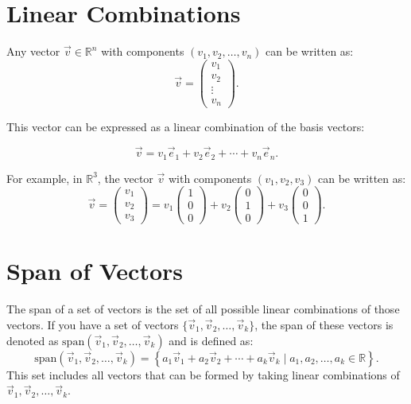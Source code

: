 \documentclass[12pt]{article}
\begin{document}
\section{Linear Combinations}

Any vector \(\vec{v} \in \mathbb{R}^n\) with components \((v_1, v_2, \ldots, v_n)\) can be written as:
\[
\vec{v} = \begin{pmatrix} v_1 \\ v_2 \\ \vdots \\ v_n \end{pmatrix}.
\]

This vector can be expressed as a linear combination of the basis vectors:

\[
\vec{v} = v_1 \vec{e}_1 + v_2 \vec{e}_2 + \cdots + v_n \vec{e}_n.
\]

For example, in \(\mathbb{R}^3\), the vector \(\vec{v}\) with components \((v_1, v_2, v_3)\) can be written as:
\[
\vec{v} = \begin{pmatrix} v_1 \\ v_2 \\ v_3 \end{pmatrix} = v_1 \begin{pmatrix} 1 \\ 0 \\ 0 \end{pmatrix} + v_2 \begin{pmatrix} 0 \\ 1 \\ 0 \end{pmatrix} + v_3 \begin{pmatrix} 0 \\ 0 \\ 1 \end{pmatrix}.
\]

\section{Span of Vectors}

The span of a set of vectors is the set of all possible linear combinations of those vectors. If you have a set of vectors \(\{\vec{v}_1, \vec{v}_2, \ldots, \vec{v}_k\}\), the span of these vectors is denoted as \(\text{span}(\vec{v}_1, \vec{v}_2, \ldots, \vec{v}_k)\) and is defined as:
\[
\text{span}(\vec{v}_1, \vec{v}_2, \ldots, \vec{v}_k) = \left\{ a_1 \vec{v}_1 + a_2 \vec{v}_2 + \cdots + a_k \vec{v}_k \mid a_1, a_2, \ldots, a_k \in \mathbb{R} \right\}.
\]
This set includes all vectors that can be formed by taking linear combinations of \(\vec{v}_1, \vec{v}_2, \ldots, \vec{v}_k\).\\
\end{document}
